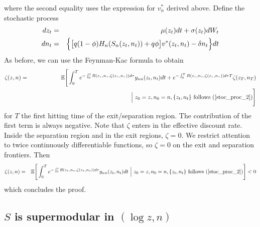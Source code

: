 where the second equality uses the expression for $v^*_n$ derived above.
Define the stochastic process
\begin{eqnarray}  \label{stoc_proc_2}
dz_t &=& \mu(z_t) dt + \sigma(z_t) dW_t  \notag \\
dn_t &=& \Big\{ \big[q (1-\phi) H_n(S_n(z_t,n_t)) + q \phi \big] v^*(z_t,n_t)
- \delta n_t \Big\} dt
\end{eqnarray}
As before, we can use the Feynman-Kac formula to obtain
\begin{eqnarray*}
\zeta(z,n) &=& \mathbb{E} \Bigg[ \int_0^T e^{- \int_0^t
R(z_\tau,n_\tau,\zeta(z_\tau,n_\tau)) d\tau} y_{nn}(z_t,n_t) dt +
e^{-\int_0^T R(z_\tau,n_\tau,\zeta(z_\tau,n_\tau)) d\tau T} \zeta(z_T,n_T) \\
&& \hskip6cm \Big| \ z_0 = z , n_0 = n , \{z_t,n_t\} \text{ follows (\ref%
{stoc_proc_2})} \Bigg]
\end{eqnarray*}
for $T$ the first hitting time of the exit/separation region. The
contribution of the first term is always negative. Note that $\zeta$ enters
in the effective discount rate. Inside the separation region and in the exit
regions, $\zeta = 0$. We restrict attention to twice continuously
differentiable functions, so $\zeta = 0$ on the exit and separation
frontiers. Then
\begin{eqnarray*}
\zeta(z,n) &=& \mathbb{E} \Bigg[ \int_0^T e^{- \int_0^t
R(z_\tau,n_\tau,\zeta(z_\tau,n_\tau)) d\tau} y_{nn}(z_t,n_t) dt \ \Big| \
z_0 = z , n_0 = n , \{z_t,n_t\} \text{ follows (\ref{stoc_proc_2})} \Bigg] <
0
\end{eqnarray*}
which concludes the proof.

\subsection{$S$ is supermodular in $(\log z, n)$}

